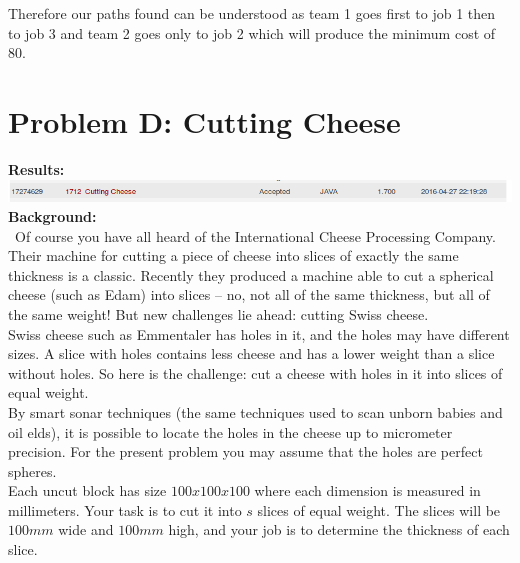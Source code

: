 \documentclass[12pt]{article}
\begin{document}
Therefore our paths found can be understood as team 1 goes first to job 1 then to job 3 and team 2 goes
only to job 2 which will produce the minimum cost of 80.
\newpage














\section{Problem D: Cutting Cheese}
\noindent \textbf{Results:} \\

\includegraphics[width=\textwidth]{ProblemD} \\

\noindent \textbf{Background:} \\
~\indent Of course you have all heard of the International Cheese Processing Company. Their machine for cutting a piece
of cheese into slices of exactly the same thickness is a classic. Recently they produced a machine able to cut
a spherical cheese (such as Edam) into slices -- no, not all of the same thickness, but all of the same weight!
But new challenges lie ahead: cutting Swiss cheese. \\
\indent Swiss cheese such as Emmentaler has holes in it, and the holes may have different sizes.  A slice with
holes contains less cheese and has a lower weight than a slice without holes. So here is the challenge: cut a
cheese with holes in it into slices of equal weight. \\
\indent By smart sonar techniques (the same techniques used to scan unborn babies and oil  elds), it is possible
to locate the holes in the cheese up to micrometer precision. For the present problem you may assume that the
holes are perfect spheres. \\
\indent Each uncut block has size $100 x 100 x 100$ where each dimension is measured in millimeters. Your
task is to cut it into $s$ slices of equal weight. The slices will be $100 mm$ wide and $100 mm$ high, and
your job is to determine the thickness of each slice. \\
\end{document}
